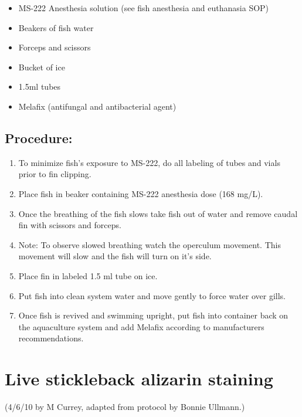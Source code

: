 \documentclass[
]{book}
\providecommand{\tightlist}{%
  \setlength{\itemsep}{0pt}\setlength{\parskip}{0pt}}
\begin{document}
\begin{itemize}
\tightlist
\item
  MS-222 Anesthesia solution (see fish anesthesia and euthanasia SOP)
\item
  Beakers of fish water
\item
  Forceps and scissors
\item
  Bucket of ice
\item
  1.5ml tubes
\item
  Melafix (antifungal and antibacterial agent)
\end{itemize}

\hypertarget{procedure-10}{%
\subsection{Procedure:}\label{procedure-10}}

\begin{enumerate}
\def\labelenumi{\arabic{enumi}.}
\tightlist
\item
  To minimize fish's exposure to MS-222, do all labeling of tubes and vials prior to fin clipping.
\item
  Place fish in beaker containing MS-222 anesthesia dose (168 mg/L).
\item
  Once the breathing of the fish slows take fish out of water and remove caudal fin with scissors and forceps.
\item
  Note: To observe slowed breathing watch the operculum movement. This movement will slow and the fish will turn on it's side.\\
\item
  Place fin in labeled 1.5 ml tube on ice.
\item
  Put fish into clean system water and move gently to force water over gills.
\item
  Once fish is revived and swimming upright, put fish into container back on the aquaculture system and add Melafix according to manufacturers recommendations.
\end{enumerate}

\hypertarget{live-stickleback-alizarin-staining}{%
\section{Live stickleback alizarin staining}\label{live-stickleback-alizarin-staining}}

(4/6/10 by M Currey, adapted from protocol by Bonnie Ullmann.)
\end{document}
